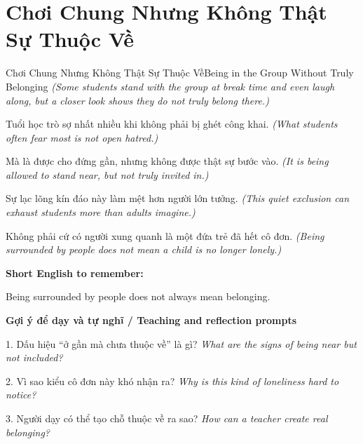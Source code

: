 \section{Chơi Chung Nhưng Không Thật Sự Thuộc Về}
\begin{truyen}{Chơi Chung Nhưng Không Thật Sự Thuộc Về}{Being in the Group Without Truly Belonging}
\textit{(Some students stand with the group at break time and even laugh along, but a closer look shows they do not truly belong there.)}

Tuổi học trò sợ nhất nhiều khi không phải bị ghét công khai.
\textit{(What students often fear most is not open hatred.)}

Mà là được cho đứng gần, nhưng không được thật sự bước vào.
\textit{(It is being allowed to stand near, but not truly invited in.)}

Sự lạc lõng kín đáo này làm mệt hơn người lớn tưởng.
\textit{(This quiet exclusion can exhaust students more than adults imagine.)}

\end{truyen}

\begin{baihoc}
Không phải cứ có người xung quanh là một đứa trẻ đã hết cô đơn.
\textit{(Being surrounded by people does not mean a child is no longer lonely.)}
\end{baihoc}

\begin{ghinhoanh}
\textbf{Short English to remember:}

Being surrounded by people does not always mean belonging.

\end{ghinhoanh}

\begin{tuhocnhanh}
\textbf{Gợi ý để dạy và tự nghĩ / Teaching and reflection prompts}

1. Dấu hiệu “ở gần mà chưa thuộc về” là gì? \textit{What are the signs of being near but not included?}

2. Vì sao kiểu cô đơn này khó nhận ra? \textit{Why is this kind of loneliness hard to notice?}

3. Người dạy có thể tạo chỗ thuộc về ra sao? \textit{How can a teacher create real belonging?}
\end{tuhocnhanh}
\ngancach


